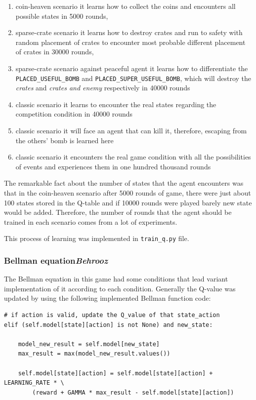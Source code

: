 \documentclass{article}
\begin{document}
\begin{enumerate}
    \item coin-heaven scenario it learns how to collect the coins and encounters all possible states in 5000 rounds,
    \item sparse-crate scenario it learns how to destroy crates and run to safety with random placement of crates to encounter most probable different placement of crates in 30000 rounds,
    \item sparse-crate scenario against peaceful agent it learns how to differentiate the \texttt{PLACED\_USEFUL\_BOMB} and \texttt{PLACED\_SUPER\_USEFUL\_BOMB}, which will destroy the \textit{crates} and \textit{crates and enemy} respectively in 40000 rounds
    \item classic scenario it learns to encounter the real states regarding the competition condition in 40000 rounds
    \item classic scenario it will face an agent that can kill it, therefore, escaping from the others' bomb is learned here
    \item classic scenario it encounters the real game condition with all the possibilities of events and experiences them in one hundred thousand rounds
\end{enumerate}


The remarkable fact about the number of states that the agent encounters was that in the coin-heaven scenario after 5000 rounds of game, there were just about 100 states stored in the Q-table and if 10000 rounds were played barely new state would be added. Therefore, the number of rounds that the agent should be trained in each scenario comes from a lot of experiments. 


This process of learning was implemented in \texttt{train\_q.py} file.

\subsubsection[Bellman equation]{Bellman equation{\normalsize \normalfont \it \hfill Behrooz}}

The Bellman equation in this game had some conditions that lead variant implementation of it according to each condition. Generally the Q-value was updated by using the following implemented Bellman function code:

\begin{verbatim}
# if action is valid, update the Q_value of that state_action
elif (self.model[state][action] is not None) and new_state: 

    model_new_result = self.model[new_state]
    max_result = max(model_new_result.values())

    self.model[state][action] = self.model[state][action] + LEARNING_RATE * \
        (reward + GAMMA * max_result - self.model[state][action])
\end{verbatim}
\end{document}
